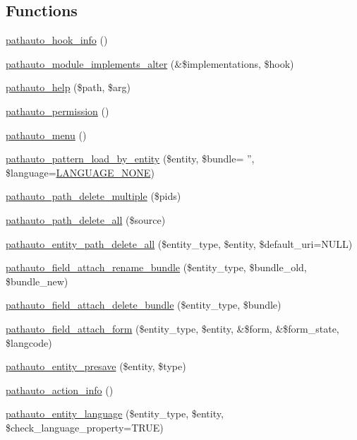 \subsection*{Functions}
\begin{DoxyCompactItemize}
\item 
\hyperlink{pathauto_8module_aec3433593badeba9c5f6d72c727c0850}{pathauto\_\-hook\_\-info} ()
\item 
\hyperlink{pathauto_8module_aaf87f3ee5c92db465e39a83dafc7e470}{pathauto\_\-module\_\-implements\_\-alter} (\&\$implementations, \$hook)
\item 
\hyperlink{pathauto_8module_aa633ee0b08bc28c487cd4f3c21f7a001}{pathauto\_\-help} (\$path, \$arg)
\item 
\hyperlink{pathauto_8module_ae4a5383114e3ed0695e109bbde6590ca}{pathauto\_\-permission} ()
\item 
\hyperlink{pathauto_8module_a32103de2e3a1451e5396ef6d7bb0b53e}{pathauto\_\-menu} ()
\item 
\hyperlink{pathauto_8module_ae0f9acc2cba367467b5ef26d4d69e7b4}{pathauto\_\-pattern\_\-load\_\-by\_\-entity} (\$entity, \$bundle= '', \$language=\hyperlink{bootstrap_8inc_a9e91e2136aa0ce5c5e80f06aa3ad8266}{LANGUAGE\_\-NONE})
\item 
\hyperlink{pathauto_8module_ae53404dbd7418362df6af153668af299}{pathauto\_\-path\_\-delete\_\-multiple} (\$pids)
\item 
\hyperlink{pathauto_8module_a5c4f73a894903516d1caecaf4f235378}{pathauto\_\-path\_\-delete\_\-all} (\$source)
\item 
\hyperlink{pathauto_8module_a3bc05a506e9cefc24923f10ae3069c79}{pathauto\_\-entity\_\-path\_\-delete\_\-all} (\$entity\_\-type, \$entity, \$default\_\-uri=NULL)
\item 
\hyperlink{pathauto_8module_a2a4e896ac2a2cadbef2fba1d848573c6}{pathauto\_\-field\_\-attach\_\-rename\_\-bundle} (\$entity\_\-type, \$bundle\_\-old, \$bundle\_\-new)
\item 
\hyperlink{pathauto_8module_a52aef356ab5cb0ed895cd418645512f5}{pathauto\_\-field\_\-attach\_\-delete\_\-bundle} (\$entity\_\-type, \$bundle)
\item 
\hyperlink{pathauto_8module_a5db998c6dbde2b0ccde267df64072f63}{pathauto\_\-field\_\-attach\_\-form} (\$entity\_\-type, \$entity, \&\$form, \&\$form\_\-state, \$langcode)
\item 
\hyperlink{pathauto_8module_ae713b574335b0b8a1069a37d63c5c365}{pathauto\_\-entity\_\-presave} (\$entity, \$type)
\item 
\hyperlink{pathauto_8module_a8ebf96e9fad62e05a7ea60bc34c85400}{pathauto\_\-action\_\-info} ()
\item 
\hyperlink{pathauto_8module_adef1a563cfdf18667ce09e30bacc5dd6}{pathauto\_\-entity\_\-language} (\$entity\_\-type, \$entity, \$check\_\-language\_\-property=TRUE)
\end{DoxyCompactItemize}
